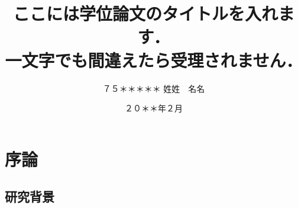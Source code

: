 \documentclass[paper=a4paper,report,fontsize=12pt,jafontsize=12pt]{jlreq}
\begin{document}


\title{ここには学位論文のタイトルを入れます．\\ 一文字でも間違えたら受理されません．}

\date{２０＊＊年２月}
\author{
７５＊＊＊＊＊
\zw %
姓姓　名名
} %

\makecover

\newpage
\setcounter{page}{0}

\chapter{序論}
\label{ch:introduction}

\lipsum[1]

\section{研究背景}
\label{sec:background}

\lipsum[1-8]

% 
% 
\end{document}
